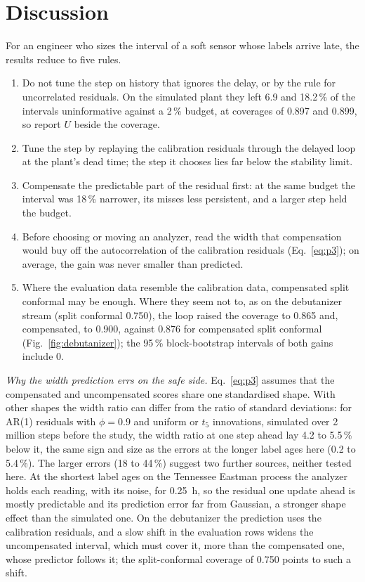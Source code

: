 \section{Discussion}\label{sec:discussion}

For an engineer who sizes the interval of a soft sensor whose labels arrive late, the results
reduce to five rules.
\begin{enumerate}\setlength{\itemsep}{0pt}
\item Do not tune the step on history that ignores the delay, or by the rule for uncorrelated
residuals. On the simulated plant they left 6.9 and 18.2\,\% of the intervals uninformative
against a 2\,\% budget, at coverages of 0.897 and 0.899, so report $U$ beside the coverage.
\item Tune the step by replaying the calibration residuals through the delayed loop at the plant's
dead time; the step it chooses lies far below the stability limit.
\item Compensate the predictable part of the residual first: at the same budget the interval was
18\,\% narrower, its misses less persistent, and a larger step held the budget.
\item Before choosing or moving an analyzer, read the width that compensation would buy off the
autocorrelation of the calibration residuals (Eq.~\eqref{eq:p3}); on average, the gain was never
smaller than predicted.
\item Where the evaluation data resemble the calibration data, compensated split conformal may be
enough. Where they seem not to, as on the debutanizer stream (split conformal 0.750), the loop raised
the coverage to 0.865 and, compensated, to 0.900, against 0.876 for compensated split conformal
(Fig.~\ref{fig:debutanizer}); the 95\,\% block-bootstrap intervals of both gains include 0.
\end{enumerate}

\emph{Why the width prediction errs on the safe side.} Eq.~\eqref{eq:p3} assumes that the
compensated and uncompensated scores share one standardised shape. With other shapes the width
ratio can differ from the ratio of standard deviations: for AR(1) residuals with $\phi = 0.9$ and
uniform or $t_5$ innovations, simulated over 2 million steps before the study, the width ratio at
one step ahead lay 4.2 to 5.5\,\% below it, the same sign and size as the errors at the longer
label ages here (0.2 to 5.4\,\%). The larger errors (18 to 44\,\%) suggest two further sources,
neither tested here. At the shortest label ages on the Tennessee Eastman process the analyzer holds
each reading, with its noise, for 0.25~h, so the residual one update ahead is mostly predictable and
its prediction error far from Gaussian, a stronger shape effect than the simulated one. On the
debutanizer the prediction uses the calibration residuals, and a slow shift in the evaluation rows
widens the uncompensated interval, which must cover it, more than the compensated one, whose
predictor follows it; the split-conformal coverage of 0.750 points to such a shift.

